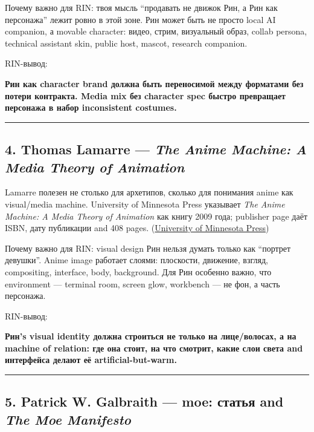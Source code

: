 Почему важно для RIN: твоя мысль ``продавать не движок Рин, а Рин как
персонажа'' лежит ровно в этой зоне. Рин может быть не просто local AI
companion, а movable character: видео, стрим, визуальный образ, collab
persona, technical assistant skin, public host, mascot, research
companion.

RIN-вывод:

\textbf{Рин как character brand должна быть переносимой между форматами
без потери контракта. Media mix без character spec быстро превращает
персонажа в набор inconsistent costumes.}

\begin{center}\rule{0.5\linewidth}{0.5pt}\end{center}

\subsection*{\texorpdfstring{4. Thomas Lamarre --- \emph{The Anime
Machine: A Media Theory of
Animation}}{4. Thomas Lamarre --- The Anime Machine: A Media Theory of Animation}}

Lamarre полезен не столько для архетипов, сколько для понимания anime
как visual/\hspace{0pt}media machine. University of Minnesota Press указывает
\emph{The Anime Machine: A Media Theory of Animation} как книгу 2009
года; publisher page даёт ISBN, дату публикации and 408 pages.
(\href{https://www.upress.umn.edu/9780816651559/the-anime-machine/?utm_source=chatgpt.com}{University
of Minnesota Press})

Почему важно для RIN: visual design Рин нельзя думать только как
``портрет девушки''. Anime image работает слоями: плоскости, движение,
взгляд, compositing, interface, body, background. Для Рин особенно
важно, что environment --- terminal room, screen glow, workbench --- не
фон, а часть персонажа.

RIN-вывод:

\textbf{Рин's visual identity должна строиться не только на
лице/\hspace{0pt}волосах, а на machine of relation: где она стоит, на что смотрит,
какие слои света and интерфейса делают её artificial-but-warm.}

\begin{center}\rule{0.5\linewidth}{0.5pt}\end{center}

\subsection*{\texorpdfstring{5. Patrick W. Galbraith --- moe: статья and
\emph{The Moe
Manifesto}}{5. Patrick W. Galbraith --- moe: статья and The Moe Manifesto}}


